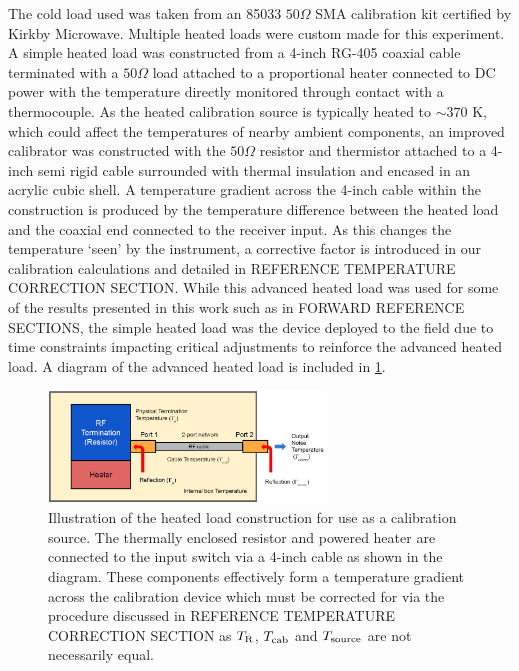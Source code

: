 The cold load used was taken from an 85033 $50 \Omega$ SMA calibration kit certified by Kirkby Microwave. Multiple heated loads were custom made for this experiment. A simple heated load was constructed from a 4-inch RG-405 coaxial cable terminated with a $50 \Omega$ load attached to a proportional heater connected to DC power with the temperature directly monitored through contact with a thermocouple. As the heated calibration source is typically heated to $\sim 370$ K, which could affect the temperatures of nearby ambient components, an improved calibrator was constructed with the $50 \Omega$ resistor and thermistor attached to a 4-inch semi rigid cable surrounded with thermal insulation and encased in an acrylic cubic shell. A temperature gradient across the 4-inch cable within the construction is produced by the temperature difference between the heated load and the coaxial end connected to the receiver input. As this changes the temperature ‘seen’ by the instrument, a corrective factor is introduced in our calibration calculations and detailed in REFERENCE TEMPERATURE CORRECTION SECTION. While this advanced heated load was used for some of the results presented in this work such as in FORWARD REFERENCE SECTIONS, the simple heated load was the device deployed to the field due to time constraints impacting critical adjustments to reinforce the advanced heated load. A diagram of the advanced heated load is included in \cref{fig:hot_load}.
\begin{figure}
    \centering
    \includegraphics[width=0.65\textwidth]{hot_load}
    \caption{Illustration of the heated load construction for use as a calibration source. The thermally enclosed resistor and powered heater are connected to the input switch via a 4-inch cable as shown in the diagram. These components effectively form a temperature gradient across the calibration device which must be corrected for via the procedure discussed in REFERENCE TEMPERATURE CORRECTION SECTION as $T_{\mathrm{R}}$, $T_{\mathrm{cab}}$ and $T_{\mathrm{source}}$ are not necessarily equal.}
    \label{fig:hot_load}
\end{figure}

